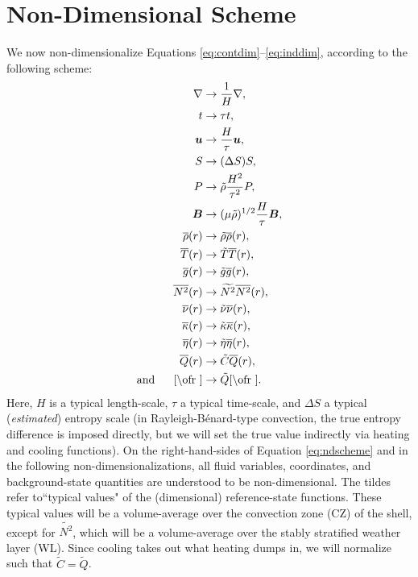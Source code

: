 \documentclass[12pt]{article}
\numberwithin{equation}{section}
\begin{document}
	\section{Non-Dimensional Scheme}
	We now non-dimensionalize Equations \eqref{eq:contdim}--\eqref{eq:inddim}, according to the following scheme:
	\begin{subequations}\label{eq:ndscheme}
	\begin{align}
		\nabla &\rightarrow \frac{1}{H}\nabla,\\
		t &\rightarrow \tau t,\\
		\vecu &\rightarrow \frac{H}{\tau} \vecu,\\
		S &\rightarrow (\Delta S) S,\\
		P &\rightarrow \tilde{\rho} \frac{H^2}{\tau^2} P,\\
		\vecb &\rightarrow (\mu\tilde{\rho})^{1/2}\frac{H}{\tau} \vecb,\\ 
		\rhoref\ofr &\rightarrow \tilde{\rho} \rhoref\ofr, \\
		\tmpref\ofr &\rightarrow \tilde{T} \tmpref\ofr,\\
		\gref\ofr &\rightarrow \tilde{g} \gref\ofr,\\
		\nsqref\ofr &\rightarrow \widetilde{N^2} \nsqref\ofr,\\
		\nuref\ofr &\rightarrow \tilde{\nu}\nuref\ofr,\\
		\kapparef\ofr &\rightarrow \tilde{\kappa}\kapparef\ofr,\\
		 \etaref\ofr &\rightarrow \tilde{\eta}\etaref\ofr,\\ 
		\qref\ofr &\rightarrow \tilde{C} \qref\ofr,\\
		\andd \cref\ofr &\rightarrow \tilde{Q} \cref\ofr.
	\end{align}
	\end{subequations}
	Here, $H$ is a typical length-scale, $\tau$ a typical time-scale, and $\Delta S$ a typical (\textit{estimated}) entropy scale (in Rayleigh-B\'enard-type convection, the true entropy difference is imposed directly, but we will set the true value indirectly via heating and cooling functions). On the right-hand-sides of Equation \eqref{eq:ndscheme} and in the following non-dimensionalizations, all fluid variables, coordinates, and background-state quantities are understood to be non-dimensional. The tildes refer to``typical values" of the (dimensional) reference-state functions. These typical values will be a volume-average over the convection zone (CZ) of the shell, except for $\widetilde{N^2}$, which will be a volume-average over the stably stratified weather layer (WL). Since cooling takes out what heating dumps in, we will normalize such that $\tilde{C}=\tilde{Q}$. 
	
\end{document}
